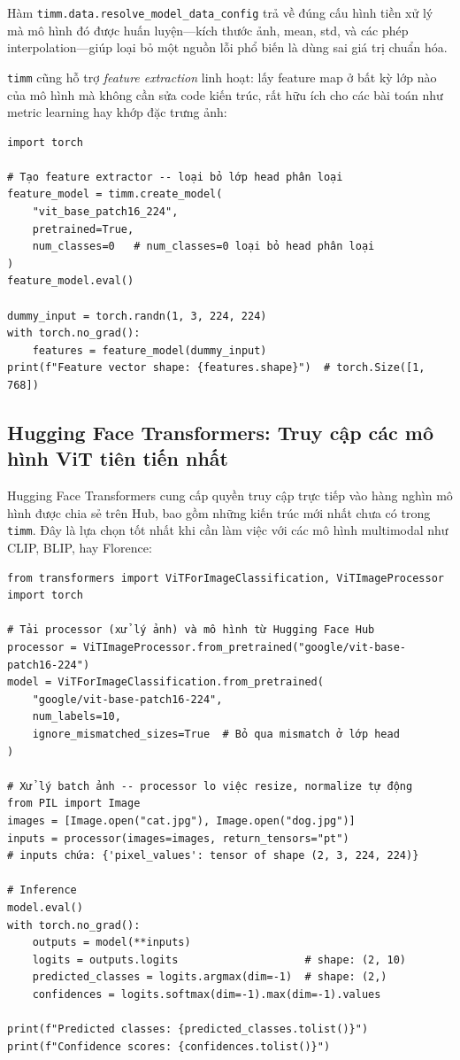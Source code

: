 Hàm \texttt{timm.data.resolve\_model\_data\_config} trả về đúng cấu hình tiền xử lý mà mô hình đó được huấn luyện---kích thước ảnh, mean, std, và các phép interpolation---giúp loại bỏ một nguồn lỗi phổ biến là dùng sai giá trị chuẩn hóa.

\vspace{0.5em}
\texttt{timm} cũng hỗ trợ \textit{feature extraction} linh hoạt: lấy feature map ở bất kỳ lớp nào của mô hình mà không cần sửa code kiến trúc, rất hữu ích cho các bài toán như metric learning hay khớp đặc trưng ảnh:

\begin{verbatim}
import torch

# Tạo feature extractor -- loại bỏ lớp head phân loại
feature_model = timm.create_model(
    "vit_base_patch16_224",
    pretrained=True,
    num_classes=0   # num_classes=0 loại bỏ head phân loại
)
feature_model.eval()

dummy_input = torch.randn(1, 3, 224, 224)
with torch.no_grad():
    features = feature_model(dummy_input)
print(f"Feature vector shape: {features.shape}")  # torch.Size([1, 768])
\end{verbatim}

\subsection*{Hugging Face Transformers: Truy cập các mô hình ViT tiên tiến nhất}

Hugging Face Transformers cung cấp quyền truy cập trực tiếp vào hàng nghìn mô hình được chia sẻ trên Hub, bao gồm những kiến trúc mới nhất chưa có trong \texttt{timm}. Đây là lựa chọn tốt nhất khi cần làm việc với các mô hình multimodal như CLIP, BLIP, hay Florence:

\begin{verbatim}
from transformers import ViTForImageClassification, ViTImageProcessor
import torch

# Tải processor (xử lý ảnh) và mô hình từ Hugging Face Hub
processor = ViTImageProcessor.from_pretrained("google/vit-base-patch16-224")
model = ViTForImageClassification.from_pretrained(
    "google/vit-base-patch16-224",
    num_labels=10,
    ignore_mismatched_sizes=True  # Bỏ qua mismatch ở lớp head
)

# Xử lý batch ảnh -- processor lo việc resize, normalize tự động
from PIL import Image
images = [Image.open("cat.jpg"), Image.open("dog.jpg")]
inputs = processor(images=images, return_tensors="pt")
# inputs chứa: {'pixel_values': tensor of shape (2, 3, 224, 224)}

# Inference
model.eval()
with torch.no_grad():
    outputs = model(**inputs)
    logits = outputs.logits                    # shape: (2, 10)
    predicted_classes = logits.argmax(dim=-1)  # shape: (2,)
    confidences = logits.softmax(dim=-1).max(dim=-1).values

print(f"Predicted classes: {predicted_classes.tolist()}")
print(f"Confidence scores: {confidences.tolist()}")
\end{verbatim}

